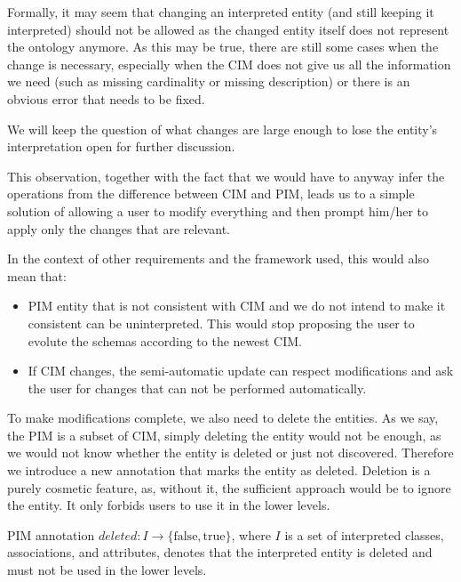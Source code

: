 Formally, it may seem that changing an interpreted entity (and still keeping it interpreted) should not be allowed as the changed entity itself does not represent the ontology anymore. As this may be true, there are still some cases when the change is necessary, especially when the CIM does not give us all the information we need (such as missing cardinality or missing description) or there is an obvious error that needs to be fixed.

We will keep the question of what changes are large enough to lose the entity's interpretation open for further discussion.

This observation, together with the fact that we would have to anyway infer the operations from the difference between CIM and PIM, leads us to a simple solution of allowing a user to modify everything and then prompt him/her to apply only the changes that are relevant.

In the context of other requirements and the framework used, this would also mean that:
\begin{itemize}
    \item PIM entity that is not consistent with CIM and we do not intend to make it consistent can be uninterpreted. This would stop proposing the user to evolute the schemas according to the newest CIM.
    \item If CIM changes, the semi-automatic update can respect modifications and ask the user for changes that can not be performed automatically.
\end{itemize}

To make modifications complete, we also need to delete the entities. As we say, the PIM is a subset of CIM, simply deleting the entity would not be enough, as we would not know whether the entity is deleted or just not discovered. Therefore we introduce a new annotation that marks the entity as deleted. Deletion is a purely cosmetic feature, as, without it, the sufficient approach would be to ignore the entity. It only forbids users to use it in the lower levels.

\begin{definition}[deleted]
    PIM annotation $deleted: I \rightarrow \{\textrm{false}, \textrm{true}\}$, where $I$ is a set of interpreted classes, associations, and attributes, denotes that the interpreted entity is deleted and must not be used in the lower levels.
\end{definition}




